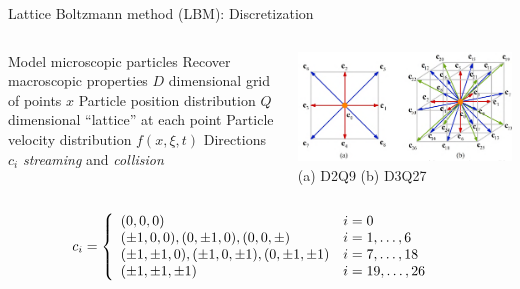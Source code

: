 \placelogofalse
\begin{frame}{Lattice Boltzmann method (LBM): Discretization}
\begin{columns}
\begin{outline}
\1 Model microscopic particles
\1 Recover macroscopic properties
\1 $D$ dimensional grid of points $x$
\2 Particle position distribution
\1 $Q$ dimensional ``lattice'' at each point
\2 Particle velocity distribution $f(x, \xi, t)$
\2 Directions $c_i$
\textit{streaming} and \textit{collision}
\end{outline}

\centering
\begin{center}
  \includegraphics[width=0.9\linewidth]{lattice_figure.png}
  (a) D2Q9 (b) D3Q27
\end{center}
\end{columns}
\begin{align*}
  c_i &= \left\{
  \begin{array}{l l}
  (0, 0, 0) & i = 0\\
  (\pm 1, 0, 0), (0, \pm 1, 0), (0, 0, \pm) & i = 1,\ldots, 6\\
  (\pm 1, \pm 1, 0), (\pm 1, 0, \pm 1), (0, \pm 1, \pm 1)
                                            & i = 7, \ldots, 18 \\
  (\pm 1, \pm 1, \pm 1) & i = 19, \ldots, 26
  \end{array}
  \right.
\end{align*}
\end{frame}
\placelogotrue


